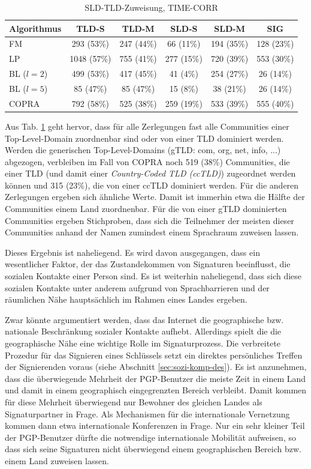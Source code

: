 \begin{table}[h]
  \centering
  \footnotesize
  \begin{tabular}{l|c|c|c|c|c}
    Algorithmus & TLD-S & TLD-M & SLD-S & SLD-M & SIG \\
    \hline
    FM & 293 (53\%) & 247 (44\%) & 66 (11\%) & 194 (35\%) & 128
    (23\%) \\
    \hline
    LP & 1048 (57\%) & 755 (41\%) & 277 (15\%) & 720 (39\%) &
    553 (30\%) \\
    \hline
    BL ($l=2$) & 499 (53\%) & 417 (45\%) & 41 (4\%) & 254 (27\%) & 26
    (14\%) \\
    \hline
    BL ($l=5$) & 85 (47\%) & 85 (47\%) & 15 (8\%) & 38 (21\%) & 26
    (14\%) \\
    \hline
    COPRA & 792 (58\%) & 525 (38\%) & 259 (19\%) & 533 (39\%) & 555 (40\%)

  \end{tabular}
  \caption{SLD-TLD-Zuweisung, TIME-CORR}
  \label{tab:assign}
\end{table}

Aus Tab. \ref{tab:assign} geht hervor, dass f\"ur alle Zerlegungen
fast alle Communities einer Top-Level-Domain zuordnenbar sind oder von
einer TLD dominiert werden. Werden die generischen Top-Level-Domains
(gTLD: com, org, net, info, ...) abgezogen, verbleiben im Fall von COPRA
noch 519 (38\%) Communities, die einer TLD (und damit einer
\emph{Country-Coded TLD (ccTLD)}) zugeordnet werden k\"onnen und 315
(23\%), die von einer ccTLD dominiert werden. F\"ur die anderen
Zerlegungen ergeben sich \"ahnliche Werte. Damit ist immerhin etwa die
H\"alfte der Communities einem Land zuordnenbar. F\"ur die von einer
gTLD dominierten Communities ergeben Stichproben, dass sich die
Teilnehmer der meisten dieser Communities anhand der Namen zumindest
einem Sprachraum zuweisen lassen.

Dieses Ergebnis ist naheliegend. Es wird davon ausgegangen, dass ein
wesentlicher Faktor, der das Zustandekommen von Signaturen
beeinflusst, die sozialen Kontakte einer Person sind. Es ist weiterhin
naheliegend, dass sich diese sozialen Kontakte unter anderem aufgrund
von Sprachbarrieren und der r\"aumlichen N\"ahe haupts\"achlich im
Rahmen eines Landes ergeben.

Zwar k\"onnte argumentiert werden, dass das Internet die geographische
bzw. nationale Beschr\"ankung sozialer Kontakte aufhebt. Allerdings
spielt die die geographische N\"ahe eine wichtige Rolle im
Signaturprozess. Die verbreitete Prozedur f\"ur das Signieren eines
Schl\"ussels setzt ein direktes pers\"onliches Treffen der
Signierenden voraus (siehe Abschnitt \ref{sec:sozi-komp-des}). Es ist
anzunehmen, dass die \"uberwiegende Mehrheit der PGP-Benutzer die
meiste Zeit in einem Land und damit in einem geographisch
eingegrenzten Bereich verbleibt. Damit kommen f\"ur diese Mehrheit
\"uberwiegend nur Bewohner des gleichen Landes als Signaturpartner in
Frage. Als Mechanismen f\"ur die internationale Vernetzung kommen dann
etwa internationale Konferenzen in Frage. Nur ein sehr kleiner Teil
der PGP-Benutzer d\"urfte die notwendige internationale Mobilit\"at
aufweisen, so dass sich seine Signaturen nicht \"uberwiegend einem
geographischen Bereich bzw. einem Land zuweisen lassen.

